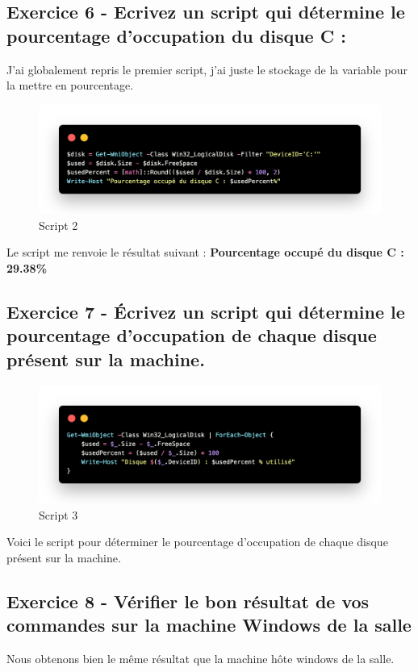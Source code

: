 \documentclass[12pt, a4paper]{article}
\begin{document}
\subsection{Exercice 6 - Ecrivez un script qui détermine le pourcentage d’occupation du disque C :}
J'ai globalement repris le premier script, j'ai juste le stockage de la variable 
pour la mettre en pourcentage. 
\begin{figure}[h]
    \centering
    \includegraphics[width=1\textwidth]{img/code2.png}
    \caption{Script 2}
    \label{fig:script2}
\end{figure}

Le script me renvoie le résultat suivant : \textbf{Pourcentage occupé du disque C : 29.38\%}

\subsection{Exercice 7 - Écrivez un script qui détermine le pourcentage d’occupation de chaque disque présent sur la machine.}
\begin{figure}[h]
    \centering
    \includegraphics[width=1\textwidth]{img/code3.png}
    \caption{Script 3}
    \label{fig:script3}
\end{figure}
Voici le script pour déterminer le pourcentage d'occupation de chaque disque présent sur la machine.\\

\subsection{Exercice 8 - Vérifier le bon résultat de vos commandes sur la machine Windows de la salle}
Nous obtenons bien le même résultat que la machine hôte windows de la salle. 
\end{document}
